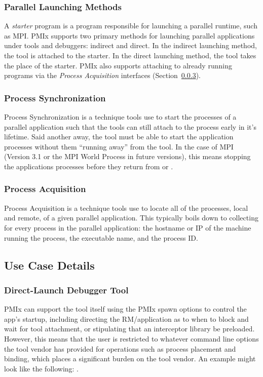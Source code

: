 \subsubsection{Parallel Launching Methods}
A \textit{starter} program is a program responsible for launching a parallel runtime, such as \ac{MPI}.  \ac{PMIx} supports two primary methods for launching parallel applications under tools and debuggers: indirect and direct. In the indirect launching method, the tool is attached to the starter.  In the direct launching method, the tool takes the place of the starter.  
\ac{PMIx} also supports attaching to already running programs via the \textit{Process Acquisition} interfaces (Section~\ref{subsubsec:process-acq}).

\subsubsection{Process Synchronization}
Process Synchronization is a technique tools use to start the processes of a parallel application such that the tools can still attach to the process early in it's lifetime.  Said another away, the tool must be able to start the application processes without them ``running away'' from the tool.  In the case of \ac{MPI} (Version 3.1 or the MPI World Process in future versions), this means stopping the applications processes before they return from  or .

\subsubsection{Process Acquisition}\label{subsubsec:process-acq}

Process Acquisition is a technique tools use to locate all of the processes, local and remote, of a given parallel application.  This typically boils down to collecting for every process in the parallel application: the hostname or IP of the machine running the process, the executable name, and the process ID.

\subsection{Use Case Details}
\subsubsection{Direct-Launch Debugger Tool}

PMIx can support the tool itself using the PMIx spawn options to control the app’s startup, including directing the RM/application as to when to block and wait for tool attachment, or stipulating that an interceptor library be preloaded. However, this means that the user is restricted to whatever command line options the tool vendor has provided for operations such as process placement and binding, which places a significant burden on the tool vendor. An example might look like the following: .

